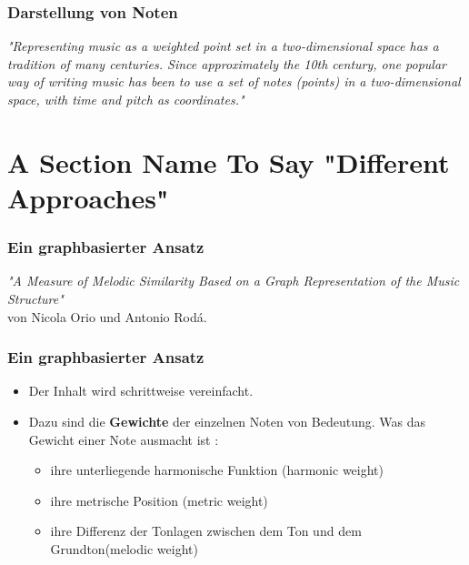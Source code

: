 \documentclass{beamer}
\begin{document}
	\begin{frame}
		\frametitle{Darstellung von Noten}
			\textit{"Representing music as a weighted point set in a two-dimensional space has a tradition of many centuries. Since approximately the 10th century, one popular way of writing music has been to use a set of notes (points) in a two-dimensional space, with time and pitch as coordinates."}\cite{three}
	\end{frame}

	\section{A Section Name To Say "Different Approaches"}

	\begin{frame}
		\frametitle{Ein graphbasierter Ansatz}
		\begin{minipage}{0.45\textwidth}
			\begin{center}
				\textit{"A Measure of Melodic Similarity Based on a Graph Representation of the Music Structure"} 
				\cite{two_point_four}  \\ 
				von Nicola Orio und Antonio Rodá.
			\end{center}
		\end{minipage}%
		\begin{minipage}{0.45\textwidth}
			\begin{figure}[h!]
			\end{figure}
		\end{minipage}
	\end{frame}


	\begin{frame}
		\frametitle{Ein graphbasierter Ansatz}
		\begin{itemize}
				\item Der Inhalt wird schrittweise vereinfacht.
				\item Dazu sind die \textbf{Gewichte} der einzelnen Noten von Bedeutung. Was das Gewicht einer Note ausmacht ist : 
					\begin{itemize}
						\item ihre unterliegende harmonische Funktion (harmonic weight)
						\item ihre metrische Position (metric weight)
						\item ihre Differenz der Tonlagen zwischen dem Ton und dem Grundton(melodic weight)
					\end{itemize}
		\end{itemize}
	\end{frame}
\end{document}
